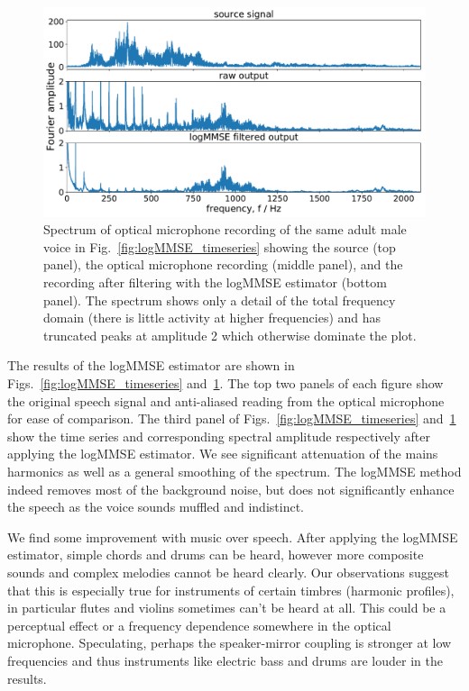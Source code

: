 \documentclass[paper-main.tex]{subfiles}
\begin{document}
\begin{figure}
	\includegraphics[width=\textwidth]{figures/combined_spectrum_melatos.pdf}
	\caption{Spectrum of optical microphone recording of the same adult male voice in Fig.~\ref{fig:logMMSE_timeseries} showing the source (top panel), the optical microphone recording (middle panel), and the recording after filtering with the logMMSE estimator (bottom panel). The spectrum shows only a detail of the total frequency domain (there is little activity at higher frequencies) and has truncated peaks at amplitude 2 which otherwise dominate the plot.}
	\label{fig:logMMSE_spectrum}
\end{figure}

The results of the logMMSE estimator are shown in Figs.~\ref{fig:logMMSE_timeseries} and~\ref{fig:logMMSE_spectrum}. The top two panels of each figure show the original speech signal and anti-aliased reading from the optical microphone for ease of comparison. The third panel of Figs.~\ref{fig:logMMSE_timeseries} and~\ref{fig:logMMSE_spectrum} show the time series and corresponding spectral amplitude respectively after applying the logMMSE estimator. We see significant attenuation of the mains harmonics as well as a general smoothing of the spectrum. The logMMSE method indeed removes most of the background noise, but does not significantly enhance the speech as the voice sounds muffled and indistinct.


We find some improvement with music over speech. After applying the logMMSE estimator, simple chords and drums can be heard, however more composite sounds and complex melodies cannot be heard clearly. Our observations suggest that this is especially true for instruments of certain timbres (harmonic profiles), in particular flutes and violins sometimes can’t be heard at all. This could be a perceptual effect or a frequency dependence somewhere in the optical microphone.
Speculating, perhaps the speaker-mirror coupling is stronger at low frequencies and thus instruments like electric bass and drums are louder in the results.
\end{document}
